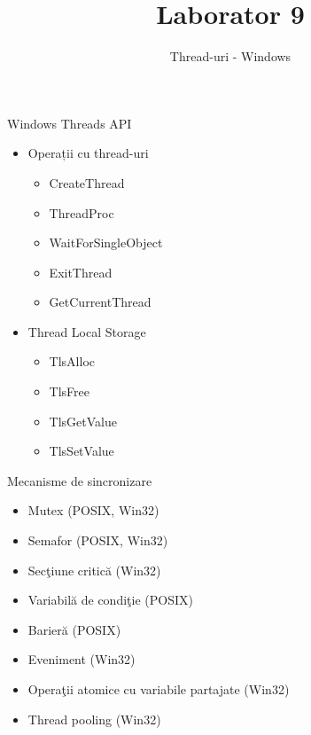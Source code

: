 \documentclass{so.cs.pub.ro}
\title[Laborator 9]{Laborator 9}
\subtitle{Thread-uri - Windows}
\begin{document}
\frame{\titlepage}

\begin{frame}{Windows Threads API}
	\begin{itemize}
            \item Operații cu thread-uri
            \begin{itemize}
		\item CreateThread
		\item ThreadProc
		\item WaitForSingleObject
		\item ExitThread
		\item GetCurrentThread
            \end{itemize}
            \item Thread Local Storage
            \begin{itemize}
                \item TlsAlloc
		\item TlsFree
		\item TlsGetValue
		\item TlsSetValue
            \end{itemize}
	\end{itemize}
\end{frame}

\begin{frame}{Mecanisme de sincronizare}
	\begin{itemize}    %
		\item Mutex (POSIX, Win32)
		\item Semafor (POSIX, Win32)
		\item Secţiune critică (Win32)
		\item Variabilă de condiţie (POSIX)
		\item Barieră (POSIX)
                \item Eveniment (Win32)
		\item Operaţii atomice cu variabile partajate (Win32)
		\item Thread pooling (Win32)
	\end{itemize}
\end{frame}
\end{document}
